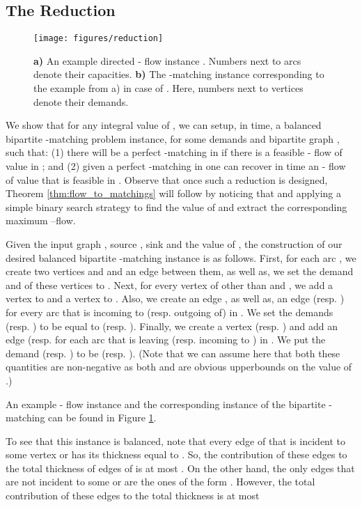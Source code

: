 \documentclass[11pt, letterpaper]{article}
\begin{document}
\subsection{The Reduction}



\begin{figure}[ht]
\centering
\vspace{8pt}
\texttt{[image: figures/reduction]}
\vspace{8pt}
\caption{{\bf a)} An example directed - flow instance . Numbers next to arcs denote their capacities.  {\bf b)} The -matching instance corresponding to the example from a) in case of . Here, numbers next to vertices denote their demands. }
\label{fig:reduction_example}
\end{figure}


We show that for any integral value of , we can setup, in  time, a balanced bipartite -matching problem instance, for some demands  and bipartite graph , such that: (1) there will be a perfect -matching in  if there is a feasible - flow of value  in ; and (2) given a perfect -matching in  one can recover in  time an - flow of value  that is feasible in . Observe that once such a reduction is designed, Theorem \ref{thm:flow_to_matchings} will follow by noticing that  and applying a simple binary search strategy to find the value of  and extract the corresponding maximum --flow. 

Given the input graph , source , sink  and the value of , the construction of our desired balanced bipartite -matching instance  is as follows. First, for each arc , we create two vertices  and  and an edge  between them, as well as, we set the demand  and  of these vertices to . Next, for every vertex  of  other than  and , we add a vertex  to  and a vertex  to . Also, we create an edge , as well as, an edge  (resp. ) for every arc  that is incoming to (resp. outgoing of)  in . We set the demands  (resp. ) to be equal to  (resp. ). Finally, we create a vertex  (resp. ) and add an edge  (resp.  for each arc  that is leaving  (resp. incoming to ) in . We put the demand  (resp. ) to be  (resp. ). (Note that we can assume here that both these quantities are non-negative as both  and  are obvious upperbounds on the value of .) 

An example - flow instance and the corresponding instance of the bipartite -matching can be found in Figure \ref{fig:reduction_example}.

To see that this instance is balanced, note that every edge  of  that is incident to some vertex  or  has its thickness  equal to . So, the contribution of these edges to the total thickness  of edges of  is at most . On the other hand, the only edges that are not incident to some  or  are the ones of the form . However, the total contribution of these edges to the total thickness is at most 
\end{document}
